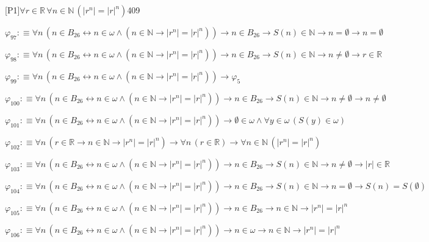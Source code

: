 \begin{fullproof}{[P1]}{$\forall r \in \mathbb{R}\,\forall n \in \mathbb{N}\,(\lvert {{r}^{n}} \rvert = {{\lvert r \rvert}^{n}})$}{409}
\begin{abbrevlist}
\item $\varphi_{97} :\equiv \forall n\,(n \in B_{26} \leftrightarrow n \in \omega \land (n \in \mathbb{N} \to \lvert {{r}^{n}} \rvert = {{\lvert r \rvert}^{n}})) \to n \in B_{26} \to S(n) \in \mathbb{N} \to n = \emptyset \to n = \emptyset$
\item $\varphi_{98} :\equiv \forall n\,(n \in B_{26} \leftrightarrow n \in \omega \land (n \in \mathbb{N} \to \lvert {{r}^{n}} \rvert = {{\lvert r \rvert}^{n}})) \to n \in B_{26} \to S(n) \in \mathbb{N} \to n \neq \emptyset \to r \in \mathbb{R}$
\item $\varphi_{99} :\equiv \forall n\,(n \in B_{26} \leftrightarrow n \in \omega \land (n \in \mathbb{N} \to \lvert {{r}^{n}} \rvert = {{\lvert r \rvert}^{n}})) \to \varphi_{5}$
\item $\varphi_{100} :\equiv \forall n\,(n \in B_{26} \leftrightarrow n \in \omega \land (n \in \mathbb{N} \to \lvert {{r}^{n}} \rvert = {{\lvert r \rvert}^{n}})) \to n \in B_{26} \to S(n) \in \mathbb{N} \to n \neq \emptyset \to n \neq \emptyset$
\item $\varphi_{101} :\equiv \forall n\,(n \in B_{26} \leftrightarrow n \in \omega \land (n \in \mathbb{N} \to \lvert {{r}^{n}} \rvert = {{\lvert r \rvert}^{n}})) \to \emptyset \in \omega \land \forall y \in \omega\,(S(y) \in \omega)$
\item $\varphi_{102} :\equiv \forall n\,(r \in \mathbb{R} \to n \in \mathbb{N} \to \lvert {{r}^{n}} \rvert = {{\lvert r \rvert}^{n}}) \to \forall n\,(r \in \mathbb{R}) \to \forall n \in \mathbb{N}\,(\lvert {{r}^{n}} \rvert = {{\lvert r \rvert}^{n}})$
\item $\varphi_{103} :\equiv \forall n\,(n \in B_{26} \leftrightarrow n \in \omega \land (n \in \mathbb{N} \to \lvert {{r}^{n}} \rvert = {{\lvert r \rvert}^{n}})) \to n \in B_{26} \to S(n) \in \mathbb{N} \to n \neq \emptyset \to \lvert r \rvert \in \mathbb{R}$
\item $\varphi_{104} :\equiv \forall n\,(n \in B_{26} \leftrightarrow n \in \omega \land (n \in \mathbb{N} \to \lvert {{r}^{n}} \rvert = {{\lvert r \rvert}^{n}})) \to n \in B_{26} \to S(n) \in \mathbb{N} \to n = \emptyset \to S(n) = S(\emptyset)$
\item $\varphi_{105} :\equiv \forall n\,(n \in B_{26} \leftrightarrow n \in \omega \land (n \in \mathbb{N} \to \lvert {{r}^{n}} \rvert = {{\lvert r \rvert}^{n}})) \to n \in B_{26} \to n \in \mathbb{N} \to \lvert {{r}^{n}} \rvert = {{\lvert r \rvert}^{n}}$
\item $\varphi_{106} :\equiv \forall n\,(n \in B_{26} \leftrightarrow n \in \omega \land (n \in \mathbb{N} \to \lvert {{r}^{n}} \rvert = {{\lvert r \rvert}^{n}})) \to n \in \omega \to n \in \mathbb{N} \to \lvert {{r}^{n}} \rvert = {{\lvert r \rvert}^{n}}$

\end{abbrevlist}
\end{fullproof}
